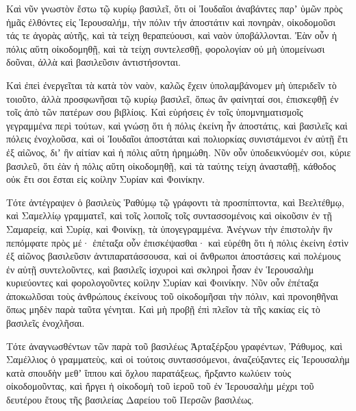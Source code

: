{Καὶ νῦν γνωστὸν ἔστω τῷ κυρίῳ βασιλεῖ, ὅτι οἱ Ἰουδαῖοι ἀναβάντες παρʼ ὑμῶν πρὸς ἡμᾶς ἐλθόντες εἰς Ἱερουσαλήμ, τὴν πόλιν τήν ἀποστάτιν καὶ πονηρὰν, οἰκοδομοῦσι τάς τε ἀγορὰς αὐτῆς, καὶ τὰ τείχη θεραπεύουσι, καὶ ναὸν ὑποβάλλονται.
Ἐὰν οὖν ἡ πόλις αὕτη οἰκοδομηθῇ, καὶ τὰ τείχη συντελεσθῇ, φορολογίαν οὐ μὴ ὑπομείνωσι δοῦναι, ἀλλὰ καὶ βασιλεῦσιν ἀντιστήσονται.
\par }{\PP {}Καὶ ἐπεὶ ἐνεργεῖται τὰ κατὰ τὸν ναὸν, καλῶς ἔχειν ὑπολαμβάνομεν μὴ ὑπεριδεῖν τὸ τοιοῦτο,
ἀλλὰ προσφωνῆσαι τῷ κυρίῳ βασιλεῖ, ὅπως ἂν φαίνηταί σοι, ἐπισκεφθῇ ἐν τοῖς ἀπὸ τῶν πατέρων σου βιβλίοις.
Καὶ εὑρήσεις ἐν τοῖς ὑπομνηματισμοῖς γεγραμμένα περὶ τούτων, καὶ γνώσῃ ὅτι ἡ πόλις ἐκείνη ἦν ἀποστάτις,
καὶ βασιλεῖς καὶ πόλεις ἐνοχλοῦσα, καὶ οἱ Ἰουδαῖοι ἀποστάται καὶ πολιορκίας συνιστάμενοι ἐν αὐτῇ ἔτι ἐξ αἰῶνος, διʼ ἣν αἰτίαν καὶ ἡ πόλις αὕτη ἠρημώθη.
Νῦν οὖν ὑποδεικνύομέν σοι, κύριε βασιλεῦ, ὅτι ἐὰν ἡ πόλις αὕτη οἰκοδομηθῇ, καὶ τὰ ταύτης τείχη ἀνασταθῇ, κάθοδος οὐκ ἔτι σοι ἔσται εἰς κοίλην Συρίαν καὶ Φοινίκην.
\par }{\PP {}Τότε ἀντέγραψεν ὁ βασιλεὺς Ῥαθύμῳ τῷ γράφοντι τὰ προσπίπτοντα, καὶ Βεελτέθμῳ, καὶ Σαμελλίῳ γραμματεῖ, καὶ τοῖς λοιποῖς τοῖς συντασσομένοις καὶ οἰκοῦσιν ἐν τῇ Σαμαρείᾳ, καὶ Συρίᾳ, καὶ Φοινίκῃ, τὰ ὑπογεγραμμένα.
Ἀνέγνων τὴν ἐπιστολὴν ἣν πεπόμφατε πρὸς μέ· ἐπέταξα οὖν ἐπισκέψασθαι· καὶ εὑρέθη ὅτι ἡ πόλις ἐκείνη ἐστὶν ἐξ αἰῶνος βασιλεῦσιν ἀντιπαρατάσσουσα,
καὶ οἱ ἄνθρωποι ἀποστάσεις καὶ πολέμους ἐν αὐτῇ συντελοῦντες, καὶ βασιλεῖς ἰσχυροὶ καὶ σκληροὶ ἦσαν ἐν Ἱερουσαλὴμ κυριεύοντες καὶ φορολογοῦντες κοίλην Συρίαν καὶ Φοινίκην.
Νῦν οὖν ἐπέταξα ἀποκωλῦσαι τοὺς ἀνθρώπους ἐκείνους τοῦ οἰκοδομῆσαι τὴν πόλιν, καὶ προνοηθῆναι ὅπως μηδὲν παρὰ ταῦτα γένηται.
Καὶ μὴ προβῇ ἐπὶ πλεῖον τὰ τῆς κακίας εἰς τὸ βασιλεῖς ἐνοχλῆσαι.
\par }{\PP {}Τότε ἀναγνωσθέντων τῶν παρὰ τοῦ βασιλέως Ἀρταξέρξου γραφέντων, Ῥάθυμος, καὶ Σαμέλλιος ὁ γραμματεὺς, καὶ οἱ τούτοις συντασσόμενοι, ἀναζεύξαντες εἰς Ἱερουσαλὴμ κατὰ σπουδὴν μεθʼ ἵππου καὶ ὄχλου παρατάξεως, ἤρξαντο κωλύειν τοὺς οἰκοδομοῦντας, καὶ ἤργει ἡ οἰκοδομὴ τοῦ ἱεροῦ τοῦ ἐν Ἱερουσαλὴμ μέχρι τοῦ δευτέρου ἔτους τῆς βασιλείας Δαρείου τοῦ Περσῶν βασιλέως.

}
